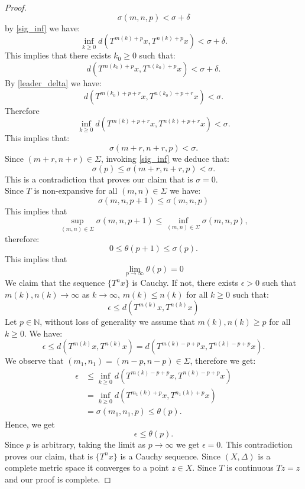 \documentclass[10pt,a4paper]{amsart}
\begin{document}
\begin{proof}
\[
\sigma(m,n,p)<\sigma+\delta
\]
by \eqref{sig_inf} we have:
\[
\inf_{k\geq 0}d(T^{m(k)+p}x,T^{n(k)+p}x)<\sigma+\delta.
\]
This implies that there exists $k_0\ge 0$ such that:
\[
d(T^{m(k_0)+p}x,T^{n(k_0)+p}x)<\sigma+\delta.
\]
By \eqref{leader_delta} we have:
\begin{equation}\label{lead_1}
d(T^{m(k_0)+p+r}x,T^{n(k_0)+p+r}x) < \sigma.
\end{equation}
Therefore
\[
\inf_{k\geq 0} d(T^{m(k)+p+r}x,T^{n(k)+p+r}x)< \sigma.
\]
This implies that:
\begin{equation}\label{lead_3}
\sigma(m+r,n+r,p) < \sigma.
\end{equation}
Since $(m+r,n+r)\in \Sigma$,  invoking \eqref{sig_inf} we deduce that:
\begin{equation}
\sigma(p)\leq \sigma(m+r,n+r,p) < \sigma.
\end{equation}
This is a contradiction that  proves our claim that is $\sigma = 0$.\\
Since $T$ is non-expansive for all $(m,n)\in \Sigma$ we have:
\[
\sigma(m,n,p+1)\leq \sigma(m,n,p)
\]
This implies that 
\[
\sup_{(m,n)\in\Sigma}\sigma(m,n,p+1)\leq  \inf_{(m,n)\in\Sigma} \sigma(m,n,p),
\]
therefore:
\[
0\leq \theta(p+1) \leq \sigma(p).
\]
This implies that 
\begin{equation}
\lim_{p\to\infty}\theta(p) = 0
\end{equation}
We claim that the sequence $\{T^{n}x\}$ is Cauchy. If not, there exists $\epsilon>0$ such that $m(k),n(k)\to \infty$ as $k\to\infty$, $m(k)\leq n(k)$ for all $k\geq 0$ such that:
\[
\epsilon\leq d(T^{m(k)}x,T^{n(k)}x)
\]
Let $p\in \mathbb{N}$, without loss of generality we assume that $m(k),n(k)\geq p$ for all $k\geq 0$. We have:
\begin{equation}
\epsilon\leq d(T^{m(k)}x,T^{n(k)}x) =  d(T^{m(k)-p+p}x,T^{n(k)-p+p}x).
\end{equation}
We observe that $(m_1,n_1) = (m-p, n-p)\in \Sigma$, therefore we get:
\begin{align}
\epsilon&\leq \inf_{k\geq 0}d(T^{m(k)-p+p}x,T^{n(k)-p+p}x)\nonumber\\
& = \inf_{k\geq 0}d(T^{m_1(k)+p}x,T^{n_1(k)+p}x)\nonumber\\
&= \sigma(m_1,n_1,p)\leq \theta(p)\nonumber.
\end{align}
Hence, we get
\[
\epsilon\leq \theta(p).
\]
Since $p$ is arbitrary, taking the limit as $p\to \infty$ we get $\epsilon = 0$. This contradiction proves our claim, that is $\{T^{n}x\}$ is a Cauchy sequence. Since $(X,\Delta)$ is a complete metric space it converges to a point $z\in X$. Since $T$ is continuous $Tz=z$ and our proof is complete.
\end{proof}
\end{document}
